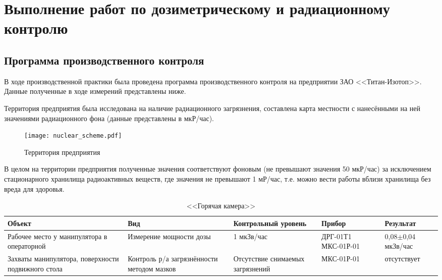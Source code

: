 \chapter{Выполнение работ по дозиметрическому и радиационному контролю} \label{chapt3}
\section{Программа производственного контроля} \label{sect3_1}
	В ходе производственной практики была проведена программа производственного 
	контроля на предприятии ЗАО <<Титан-Изотоп>>. Данные полученные в 
	ходе измерений представлены ниже.

	Территория предприятия была исследована на наличие радиационного загрязнения,
	составлена карта местности с нанесёнными на ней значениями радиационного фона  
	(данные представлены в мкР/час).

	\begin{figure}[ht]
		\centering
		\texttt{[image: nuclear\_scheme.pdf]}
		\caption{Территория предприятия}
	\end{figure}

	В целом на территории предприятия полученные значения соответствуют фоновым 
	(не превышают значения 50 мкР/час) за исключением стационарного хранилища 
	радиоактивных веществ, где значения не превышают 1 мР/час, т.е. можно 
	вести работы вблизи хранилища без вреда для здоровья.

	\begin{table}[ht]
		\centering
		\caption{<<Горячая камера>>}
		\begin{tabular}{|p{4cm}|p{2.5cm}|p{3cm}|p{2.8cm}|p{2.5cm}|}
			\hline
			Объект & Вид & Контрольный уровень & Прибор & Результат \\ \hline
			Рабочее место у манипулятора в операторной & Измерение мощности дозы & 
				1 мкЗв/час & ДРГ-01Т1 МКС-01Р-01 & 0,08\( \pm \)0,04 мкЗв/час \\ \hline
			Захваты манипулятора, поверхности подвижного стола & Контроль р/а 
				загрязнённости методом мазков & Отсутствие снимаемых загрязнений &
				МКС-01Р-01 & отсутствует \\ \hline
		\end{tabular}
	\end{table}

